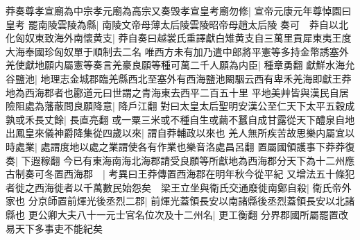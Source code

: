 莽奏尊孝宣廟為中宗孝元廟為高宗又奏毁孝宣皇考廟勿修|{
	宣帝元康元年尊悼園曰皇考}
罷南陵雲陵為縣|{
	南陵文帝母薄太后陵雲陵昭帝母趙太后陵}
奏可　莽自以北化匈奴東致海外南懷黄支|{
	莽自奏曰越裳氏重譯獻白雉黄支自三萬里貢犀東夷王度大海奉國珍匈奴單于順制去二名}
唯西方未有加乃遣中郎將平憲等多持金幣誘塞外羌使獻地願内屬憲等奏言羌豪良願等種可萬二千人願為内臣|{
	種章勇翻}
獻鮮水海允谷鹽池|{
	地理志金城郡臨羌縣西北至塞外有西海鹽池闞駰云西有卑禾羌海即獻王莽地為西海郡者也酈道元曰世謂之青海東去西平二百五十里}
平地美艸皆與漢民自居險阻處為藩蔽問良願降意|{
	降戶江翻}
對曰太皇太后聖明安漢公至仁天下太平五穀成孰或禾長丈餘|{
	長直亮翻}
或一粟三米或不種自生或繭不蠶自成甘露從天下醴泉自地出鳳皇來儀神爵降集從四歲以來|{
	謂自莽輔政以來也}
羌人無所疾苦故思樂内屬宜以時處業|{
	處謂度地以處之業謂使各有作業也樂音洛處昌呂翻}
置屬國領護事下莽莽復奏|{
	下遐稼翻}
今已有東海南海北海郡請受良願等所獻地為西海郡分天下為十二州應古制奏可冬置西海郡　|{
	考異曰王莽傳置西海郡在明年秋今從平紀}
又增法五十條犯者徙之西海徙者以千萬數民始怨矣　梁王立坐與衛氏交通廢徙南鄭自殺|{
	衛氏帝外家也}
分京師置前煇光後丞烈二郡|{
	前煇光蓋領長安以南諸縣後丞烈蓋領長安以北諸縣也}
更公卿大夫八十一元士官名位次及十二州名|{
	更工衡翻}
分界郡國所屬罷置改易天下多事吏不能紀矣

